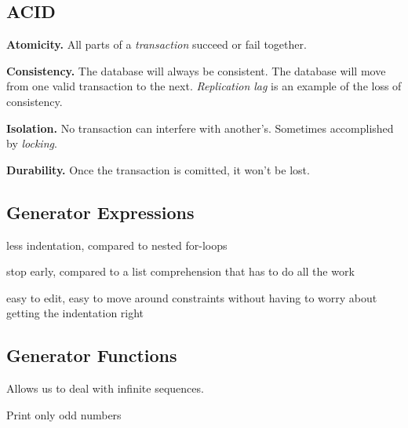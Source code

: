 \documentclass[12pt]{article}
\begin{document}
\subsection{ACID}

\textbf{Atomicity.} All parts of a \emph{transaction} succeed or fail together.

\textbf{Consistency.} The database will always be consistent. The database will move from one valid transaction to the next. \emph{Replication lag} is an example of the loss of consistency.

\textbf{Isolation.} No transaction can interfere with another's. Sometimes accomplished by \emph{locking}.

\textbf{Durability.} Once the transaction is comitted, it won't be lost.



\subsection{Generator Expressions}

\begin{list}{*}{
\setlength{\itemsep}{0pt}
\setlength{\parsep}{0pt}
\setlength{\topsep}{0pt}
\setlength{\partopsep}{0pt}
\setlength{\leftmargin}{2em}
\setlength{\labelwidth}{1.5em}
\setlength{\labelsep}{0.5em}
}
\item less indentation, compared to nested for-loops
\item stop early, compared to a list comprehension that has to do all the work
\item easy to edit, easy to move around constraints without having to worry about getting the indentation right
\end{list}






\subsection{Generator Functions}

Allows us to deal with infinite sequences.



Print only odd numbers


\end{document}
